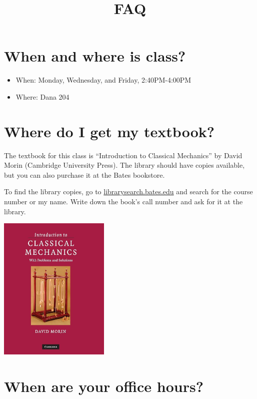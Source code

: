 \documentclass[
  letterpaper,
  DIV=11,
  numbers=noendperiod]{scrartcl}
\title{FAQ}
\author{}
\date{}
\providecommand{\tightlist}{%
  \setlength{\itemsep}{0pt}\setlength{\parskip}{0pt}}\usepackage{longtable,booktabs,array}
\renewcommand*\contentsname{Table of contents}
\newcommand\contentsname{Table of contents}
\begin{document}
\maketitle

\renewcommand*\contentsname{Table of contents}
{
\hypersetup{linkcolor=}
\setcounter{tocdepth}{3}
\tableofcontents
}
\section{When and where is class?}\label{when-and-where-is-class}

\begin{itemize}
\tightlist
\item
  When: Monday, Wednesday, and Friday, 2:40PM-4:00PM
\item
  Where: Dana 204
\end{itemize}

\section{Where do I get my textbook?}\label{where-do-i-get-my-textbook}

The textbook for this class is ``Introduction to Classical Mechanics''
by David Morin (Cambridge University Press). The library should have
copies available, but you can also purchase it at the Bates bookstore.

To find the library copies, go to \url{librarysearch.bates.edu} and
search for the course number or my name. Write down the book's call
number and ask for it at the library.

\includegraphics[width=2.08333in,height=\textheight]{images/Morin.jpg}

\section{When are your office hours?}\label{officehours}
\end{document}
